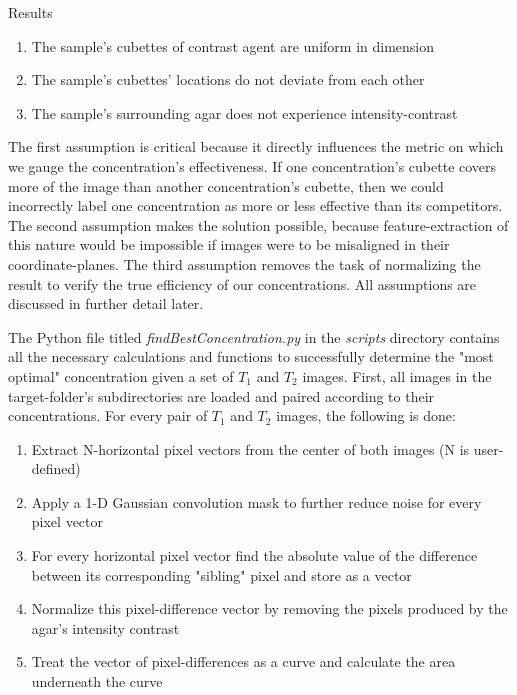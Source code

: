 \documentclass[a4paper,12pt]{article}
\begin{document}
\begin{section}{Results}
\singlespacing
\begin{enumerate}
\item The sample's cubettes of contrast agent are uniform in dimension
\item The sample's cubettes' locations do not deviate from each other
\item The sample's surrounding agar does not experience intensity-contrast
\end{enumerate}
\doublespacing

The first assumption is critical because it directly influences the metric on which we gauge the concentration's effectiveness. If one concentration's cubette covers more of the image than another concentration's cubette, then we could incorrectly label one concentration as more or less effective than its competitors. The second assumption makes the solution possible, because feature-extraction of this nature would be impossible if images were to be misaligned in their coordinate-planes. The third assumption removes the task of normalizing the result to verify the true efficiency of our concentrations. All assumptions are discussed in further detail later.

The Python file titled {\em findBestConcentration.py} in the {\em scripts} directory contains all the necessary calculations and functions to successfully determine the "most optimal" concentration given a set of $T_1$ and $T_2$ images. First, all images in the target-folder's subdirectories are loaded and paired according to their concentrations. For every pair of $T_1$ and $T_2$ images, the following is done:

\singlespacing
\begin{enumerate}
\item Extract N-horizontal pixel vectors from the center of both images (N is user-defined)
\item Apply a 1-D Gaussian convolution mask to further reduce noise for every pixel vector
\item For every horizontal pixel vector find the absolute value of the difference between its corresponding "sibling" pixel and store as a vector
\item Normalize this pixel-difference vector by removing the pixels produced by the agar's intensity contrast
\item Treat the vector of pixel-differences as a curve and calculate the area underneath the curve
\end{enumerate}

\doublespacing


\end{section}
\end{document}
